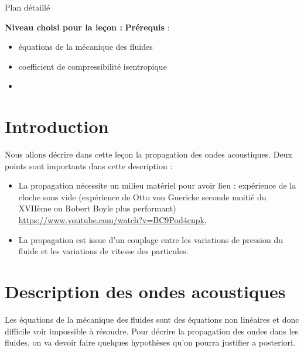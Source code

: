 \begin{reportBlock}{Plan détaillé}

  \textbf{Niveau choisi pour la leçon :} 
  \newline
  \textbf{Prérequis} : \begin{itemize}
      \item équations de la mécanique des fluides
      \item coefficient de compressibilité isentropique
      \item 
  \end{itemize}
  
  \section*{Introduction}
  Nous allons décrire dans cette leçon la propagation des ondes acoustiques. Deux points sont importants dans cette description :
  \begin{itemize}
      \item La propagation nécessite un milieu matériel pour avoir lieu : expérience de la cloche sous vide (expérience de Otto von Guericke seconde moitié du XVIIème ou Robert Boyle plus performant) \url{https://www.youtube.com/watch?v=BC9Pod4cnpk},
      \item La propagation est issue d'un couplage entre les variations de pression du fluide et les variations de vitesse des particules.
  \end{itemize}
  
  \section{Description des ondes acoustiques}
  Les équations de la mécanique des fluides sont des équations non linéaires et donc difficile voir impossible à résoudre. Pour décrire la propagation des ondes dans les fluides, on va devoir faire quelques hypothèses qu'on pourra justifier a posteriori.
  

\end{reportBlock}
